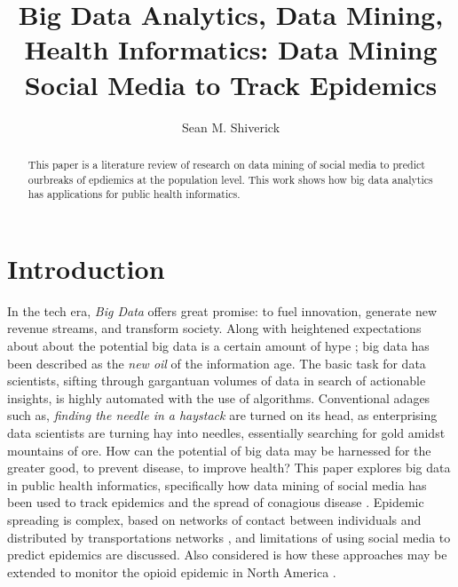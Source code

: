 \documentclass[sigconf]{acmart}
\begin{document}
\title{Big Data Analytics, Data Mining, Health Informatics: 
Data Mining Social Media to Track Epidemics}
\author{Sean M. Shiverick}


\begin{abstract}
This paper is a literature review of research on data mining of social media 
to predict ourbreaks of epdiemics at the population level. This work shows how 
big data analytics has applications for public health informatics.
\end{abstract}


\maketitle

\section{Introduction}

In the tech era, \textit{Big Data} offers great promise: to fuel innovation, 
generate new revenue streams, and transform society. Along with heightened 
expectations about about the potential big data is a certain amount of hype 
\cite{gupta15}; big data has been described as the \textit{new oil} of the 
information age.  The basic task for data scientists, sifting through gargantuan 
volumes of data in search of actionable insights, is highly automated with the 
use of algorithms. Conventional adages such as, \textit{finding the needle in 
a haystack} are turned on its head, as enterprising data scientists are turning 
hay into needles, essentially searching for gold amidst mountains of ore. How 
can the potential of big data may be harnessed for the greater good, to prevent 
disease, to improve health? This paper explores big data in public health 
informatics, specifically how data mining of social media has been used to track 
epidemics and the spread of conagious disease \cite{hay13}. Epidemic spreading 
is complex, based on networks of contact between individuals and distributed by 
transportations networks \cite{vespignani15}, and limitations of using social 
media to predict epidemics are discussed. Also considered is how these approaches 
may be extended to monitor the opioid epidemic in North America \cite{volkow14}.
\end{document}

